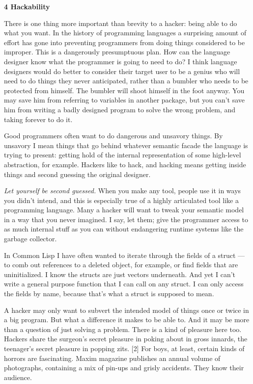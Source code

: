 \textbf{4 Hackability}

There is one thing more important than brevity to a hacker: being able
to do what you want. In the history of programming languages a
surprising amount of effort has gone into preventing programmers from
doing things considered to be improper. This is a dangerously
presumptuous plan. How can the language designer know what the
programmer is going to need to do? I think language designers would do
better to consider their target user to be a genius who will need to do
things they never anticipated, rather than a bumbler who needs to be
protected from himself. The bumbler will shoot himself in the foot
anyway. You may save him from referring to variables in another package,
but you can't save him from writing a badly designed program to solve
the wrong problem, and taking forever to do it.

Good programmers often want to do dangerous and unsavory things. By
unsavory I mean things that go behind whatever semantic facade the
language is trying to present: getting hold of the internal
representation of some high-level abstraction, for example. Hackers like
to hack, and hacking means getting inside things and second guessing the
original designer.

\emph{Let yourself be second guessed.} When you make any tool, people
use it in ways you didn't intend, and this is especially true of a
highly articulated tool like a programming language. Many a hacker will
want to tweak your semantic model in a way that you never imagined. I
say, let them; give the programmer access to as much internal stuff as
you can without endangering runtime systems like the garbage collector.

In Common Lisp I have often wanted to iterate through the fields of a
struct --- to comb out references to a deleted object, for example, or
find fields that are uninitialized. I know the structs are just vectors
underneath. And yet I can't write a general purpose function that I can
call on any struct. I can only access the fields by name, because that's
what a struct is supposed to mean.

A hacker may only want to subvert the intended model of things once or
twice in a big program. But what a difference it makes to be able to.
And it may be more than a question of just solving a problem. There is a
kind of pleasure here too. Hackers share the surgeon's secret pleasure
in poking about in gross innards, the teenager's secret pleasure in
popping zits. {[}2{]} For boys, at least, certain kinds of horrors are
fascinating. Maxim magazine publishes an annual volume of photographs,
containing a mix of pin-ups and grisly accidents. They know their
audience.


